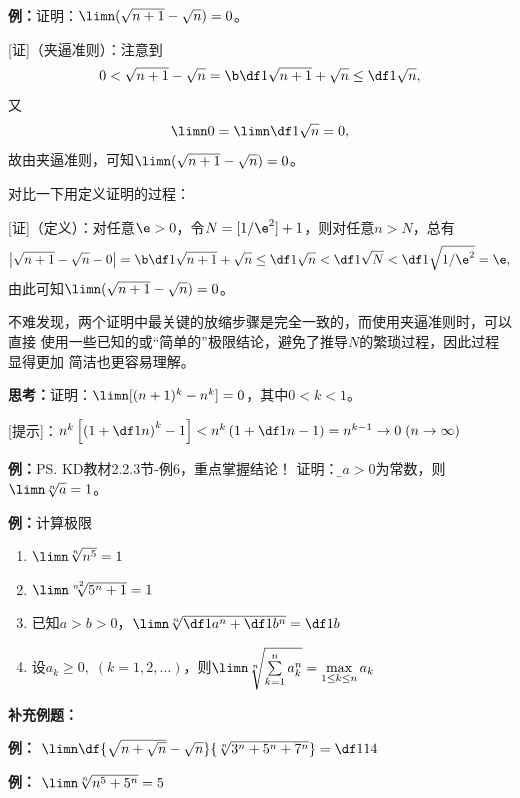 {\bf 例：}证明：$\limn (\sqrt{n+1}-\sqrt{n})=0$。

[证]（夹逼准则）：注意到
$$0<\sqrt{n+1}-\sqrt{n}={\b\df1{\sqrt{n+1}+\sqrt{n}}
\leq\df 1{\sqrt{n}}},$$
又
$$\limn 0=\limn\df 1{\sqrt{n}}=0,$$
故由夹逼准则，可知$\limn (\sqrt{n+1}-\sqrt{n})=0$。

对比一下用定义证明的过程：

[证]（定义）：对任意$\e>0$，令$N=[1/\e^2]+1$，则对任意$n>N$，总有
$$\left|\sqrt{n+1}-\sqrt{n}-0\right|
={\b\df1{\sqrt{n+1}+\sqrt{n}}\leq\df 1{\sqrt{n}}}
<\df 1{\sqrt{N}}<\df 1{\sqrt{1/\e^2}}=\e,$$
由此可知$\limn (\sqrt{n+1}-\sqrt{n})=0$。

不难发现，两个证明中最关键的放缩步骤是完全一致的，而使用夹逼准则时，可以直接
使用一些已知的或“简单的”极限结论，避免了推导$N$的繁琐过程，因此过程显得更加
简洁也更容易理解。

{\bf 思考：}证明：$\limn [(n+1)^k-{n}^k]=0$，其中$0<k<1$。

[提示]：$n^k\left[\left(1+\df1n\right)^k-1\right]
<n^k\left(1+\df1n-1\right)=n^{k-1}\to 0\;(n\to\infty)$

{\bf 例：}\ps{KD教材2.2.3节-例6，重点掌握结论！}
证明：{\b 若$a>0$为常数，则$\limn \sqrt[n]{a}=1$}。

{\bf 例：}计算极限
\begin{enumerate}[(1)]
  \setlength{\itemindent}{1cm}
  \item $\limn\sqrt[n]{n^5}=1$
  \item $\limn\sqrt[n^2]{5^n+1}=1$
  \item 已知$a>b>0$，$\limn\sqrt[n]{\df1{a^n}+\df1{b^n}}=\df1b$
  \item 设$a_k\geq0,\;(k=1,2,\ldots)$，则$\limn\sqrt[n]
  {\sum\limits_{k=1}^na_k^n}=\max\limits_{1\leq k\leq n}a_k$
\end{enumerate}
 
{\bf 补充例题：}

{\bf 例：} $\limn\df{\sqrt{n+\sqrt n}-\sqrt n}{\sqrt[n]{3^n+5^n+7^n}}=\df1{14}$


{\bf 例：} $\limn\sqrt[n]{n^5+5^n}=5$

